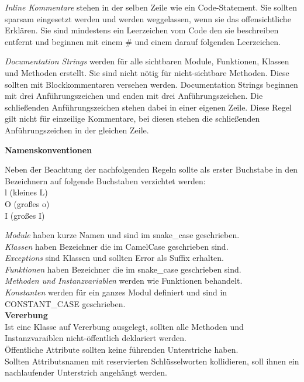 \textit{Inline Kommentare} stehen in der selben Zeile wie ein Code-Statement. Sie sollten sparsam eingesetzt werden und werden weggelassen, wenn sie das offensichtliche Erklären. Sie sind mindestens ein Leerzeichen vom Code den sie beschreiben entfernt und beginnen mit einem \# und einem darauf folgenden Leerzeichen. 

\textit{Documentation Strings} werden für alle sichtbaren Module, Funktionen, Klassen und Methoden erstellt. Sie sind nicht nötig für nicht-sichtbare Methoden. Diese sollten mit Blockkommentaren versehen werden. Documentation Strings beginnen mit drei Anführungszeichen und enden mit drei Anführungszeichen. Die schließenden Anführungszeichen stehen dabei in einer eigenen Zeile. Diese Regel gilt nicht für einzeilige Kommentare, bei diesen stehen die schließenden Anführungszeichen in der gleichen Zeile.

\textbf{Namenskonventionen}\\
\begin{tabbing}
Neben \= der Beachtung der nachfolgenden Regeln sollte als erster Buchstabe in den \\
Bezeichnern auf folgende Buchstaben verzichtet werden:\\
\> l (kleines L) \\
\> O (großes o)\\
\> I (großes I)
\end{tabbing}
\textit{Module} haben kurze Namen und sind im snake\_case geschrieben. \\
\textit{Klassen} haben Bezeichner die im CamelCase geschrieben sind.\\
\textit{Exceptions} sind Klassen und sollten \glqq Error\grqq\: als Suffix erhalten.\\
\textit {Funktionen} haben Bezeichner die im snake\_case geschrieben sind.\\
\textit{Methoden und Instanzvariablen} werden wie Funktionen behandelt.\\
\textit{Konstanten} werden für ein ganzes Modul definiert und sind in CONSTANT\_CASE geschrieben.\\

\textbf{Vererbung}\\
Ist eine Klasse auf Vererbung ausgelegt, sollten alle Methoden und Instanzvaraiblen nicht-öffentlich deklariert werden.\\
Öffentliche Attribute sollten keine führenden Unterstriche haben.\\
Sollten Attributsnamen mit reservierten Schlüsselworten kollidieren, soll ihnen ein nachlaufender Unterstrich angehängt werden.\\

